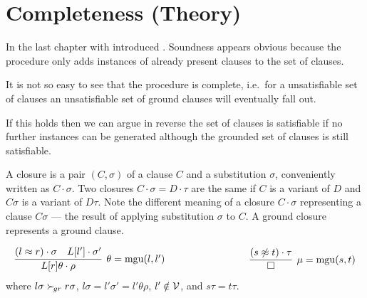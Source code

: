 
\chapter{Completeness (Theory)}

In the last chapter with introduced \InstGenEQ.
Soundness appears obvious because the procedure
only adds instances of already present clauses to the set of clauses.

It is not so easy to see that the procedure is complete,
i.e.~for a unsatisfiable set of clauses an unsatisfiable
set of ground clauses will eventually fall out.

If this holds then we can argue in reverse the set of clauses is satisfiable
if no further instances can be generated although the grounded set of clauses is still satisfiable.








\begin{definition}
    A closure is a pair $(C,\sigma)$ of a clause $C$ and a substitution $\sigma$,
    conveniently written as $C\cdot\sigma$. Two closures $C\cdot\sigma = D\cdot\tau$
    are the same if $C$ is a variant of $D$ and $C\sigma$ is a variant of $D\tau$.
    Note the different meaning of a closure $C\cdot\sigma$ representing a clause $C\sigma$
    --- the result of applying substitution $\sigma$ to $C$.
    A ground closure represents a ground clause.
\end{definition}










\begin{definition}
\begin{gather*}
        \infer[\theta=\mgu(l,l')]
        {L[r]\theta\cdot\rho}
        {(l\mEQ r)\cdot\sigma & L[l']\cdot\sigma'}
        \hspace{3cm}
        \infer[\mu=\mgu(s,t)]
        {\emptyclause}
        {(s\mNE t)\cdot\tau}
\end{gather*}
where
    $l\sigma\mathrel\succ_{\!gr} r\sigma$,
    $l\sigma = l'\sigma' = l'\theta\rho$,
    $l'\notin\mathcal{V}$,
    and
    $s\tau = t\tau$.
\end{definition}

